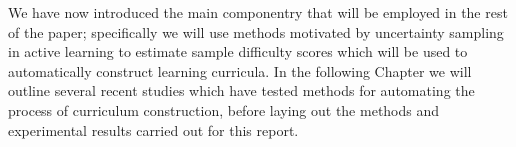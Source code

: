 We have now introduced the main componentry that will be employed in the rest of the paper; specifically we will use methods motivated by uncertainty sampling in active learning to estimate sample difficulty scores which will be used to automatically construct learning curricula. In the following Chapter we will outline several recent studies which have tested methods for automating the process of curriculum construction, before laying out the methods and experimental results carried out for this report. 